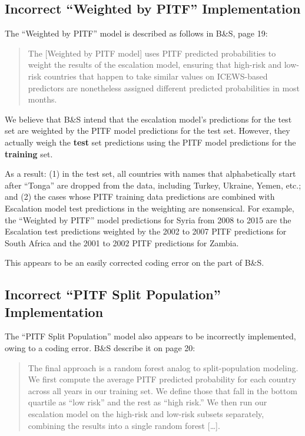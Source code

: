 \documentclass[
]{article}
\begin{document}
\hypertarget{incorrect-weighted-by-pitf-implementation}{%
\subsection{Incorrect ``Weighted by PITF'' Implementation}\label{incorrect-weighted-by-pitf-implementation}}

The ``Weighted by PITF'' model is described as follows in B\&S, page 19:

\begin{quote}
The {[}Weighted by PITF model{]} uses PITF predicted probabilities to weight the results of the escalation model, ensuring that high-risk and low-risk countries that happen to take similar values on ICEWS-based predictors are nonetheless assigned different predicted probabilities in most months.
\end{quote}

We believe that B\&S intend that the escalation model's predictions for the test set are weighted by the PITF model predictions for the test set. However, they actually weigh the \textbf{test} set predictions using the PITF model predictions for the \textbf{training} set.

As a result: (1) in the test set, all countries with names that alphabetically start after ``Tonga'' are dropped from the data, including Turkey, Ukraine, Yemen, etc.; and (2) the cases whose PITF training data predictions are combined with Escalation model test predictions in the weighting are nonsensical. For example, the ``Weighted by PITF'' model predictions for Syria from 2008 to 2015 are the Escalation test predictions weighted by the 2002 to 2007 PITF predictions for South Africa and the 2001 to 2002 PITF predictions for Zambia.

This appears to be an easily corrected coding error on the part of B\&S.

\hypertarget{incorrect-pitf-split-population-implementation}{%
\subsection{Incorrect ``PITF Split Population'' Implementation}\label{incorrect-pitf-split-population-implementation}}

The ``PITF Split Population'' model also appears to be incorrectly implemented, owing to a coding error. B\&S describe it on page 20:

\begin{quote}
The final approach is a random forest analog to split-population modeling. We first compute the average PITF predicted probability for each country across all years in our training set. We define those that fall in the bottom quartile as ``low risk'' and the rest as ``high risk.'' We then run our escalation model on the high-risk and low-risk subsets separately, combining the results into a single random forest {[}\ldots{]}.
\end{quote}
\end{document}
